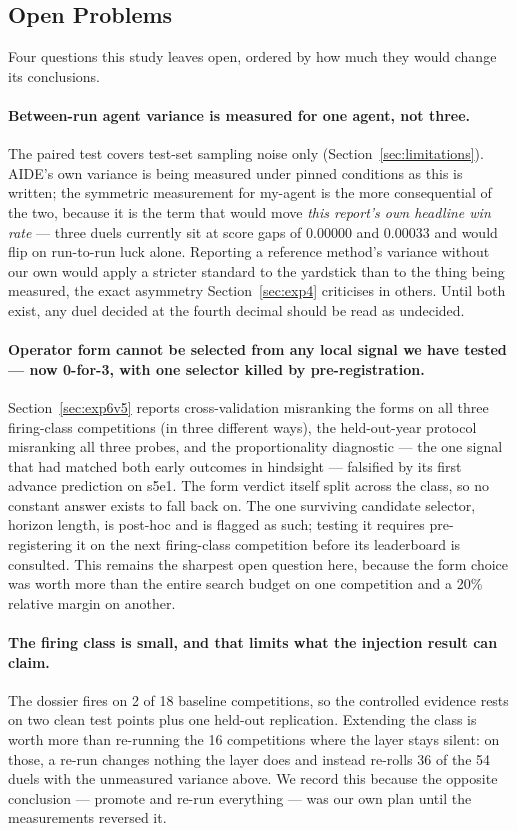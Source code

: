 \documentclass[11pt,a4paper]{article}
\begin{document}
\subsection{Open Problems}
\label{sec:future}

Four questions this study leaves open, ordered by how much they would change its conclusions.

\paragraph{Between-run agent variance is measured for one agent, not three.} The paired test
covers test-set sampling noise only (Section~\ref{sec:limitations}). AIDE's own variance is
being measured under pinned conditions as this is written; the symmetric measurement for
my-agent is the more consequential of the two, because it is the term that would move
\emph{this report's own headline win rate} --- three duels currently sit at score gaps of
$0.00000$ and $0.00033$ and would flip on run-to-run luck alone. Reporting a reference
method's variance without our own would apply a stricter standard to the yardstick than to
the thing being measured, the exact asymmetry Section~\ref{sec:exp4} criticises in others.
Until both exist, any duel decided at the fourth decimal should be read as undecided.

\paragraph{Operator form cannot be selected from any local signal we have tested --- now
0-for-3, with one selector killed by pre-registration.} Section~\ref{sec:exp6v5} reports
cross-validation misranking the forms on all three firing-class competitions (in three
different ways), the held-out-year protocol misranking all three probes, and the
proportionality diagnostic --- the one signal that had matched both early outcomes in
hindsight --- falsified by its first advance prediction on s5e1. The form verdict itself split
across the class, so no constant answer exists to fall back on. The one surviving candidate
selector, horizon length, is post-hoc and is flagged as such; testing it requires
pre-registering it on the next firing-class competition before its leaderboard is consulted.
This remains the sharpest open question here, because the form choice was worth more than the
entire search budget on one competition and a 20\% relative margin on another.

\paragraph{The firing class is small, and that limits what the injection result can claim.}
The dossier fires on 2 of 18 baseline competitions, so the controlled evidence rests on two
clean test points plus one held-out replication. Extending the class is worth more than
re-running the 16 competitions where the layer stays silent: on those, a re-run changes
nothing the layer does and instead re-rolls 36 of the 54 duels with the unmeasured variance
above. We record this because the opposite conclusion --- promote and re-run everything ---
was our own plan until the measurements reversed it.
\end{document}

